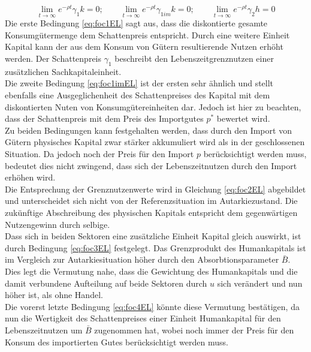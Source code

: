%
\vspace{-0.6cm}
%
\begin{equation}
	\lim_{t \to \infty}e^{-\rho t}\gamma_1k=0;\qquad \lim_{t \to \infty}e^{-\rho t}\gamma_{1im}k=0; \qquad \lim_{t \to \infty}e^{-\rho t}\gamma_2h=0
\end{equation}
%
Die erste Bedingung \eqref{eq:foc1EL} sagt aus, dass die diskontierte gesamte Konsumgütermenge dem Schattenpreis entspricht. Durch eine weitere Einheit Kapital kann der aus dem Konsum von Gütern resultierende Nutzen erhöht werden. Der Schattenpreis $\gamma_1$ beschreibt den Lebenszeitgrenznutzen einer zusätzlichen Sachkapitaleinheit.\\
%
Die zweite Bedingung \eqref{eq:foc1imEL} ist der ersten sehr ähnlich und stellt ebenfalls eine Ausgeglichenheit des Schattenpreises des Kapital mit dem diskontierten Nuten von Konsumgütereinheiten dar. Jedoch ist hier zu beachten, dass der Schattenpreis mit dem Preis des Importgutes $p^*$ bewertet wird.\\
%
Zu beiden Bedingungen kann festgehalten werden, dass durch den Import von Gütern physisches Kapital zwar stärker akkumuliert wird als in der geschlossenen Situation. Da jedoch noch der Preis für den Import $p$ berücksichtigt werden muss, bedeutet dies nicht zwingend, dass sich der Lebenszeitnutzen durch den Import erhöhen wird.\\
%
Die Entsprechung der Grenznutzenwerte wird in Gleichung \eqref{eq:foc2EL} abgebildet und unterscheidet sich nicht von der Referenzsituation im Autarkiezustand. Die zukünftige Abschreibung des physischen Kapitals entspricht dem gegenwärtigen Nutzengewinn durch selbige. \\
%
Dass sich in beiden Sektoren eine zusätzliche Einheit Kapital gleich auswirkt, ist durch Bedingung \eqref{eq:foc3EL} festgelegt. Das Grenzprodukt des Humankapitals ist im Vergleich zur Autarkiesituation höher durch den Absorbtionsparameter $\bar{B}$. Dies legt die Vermutung nahe, dass die Gewichtung des Humankapitals und die damit verbundene Aufteilung auf beide Sektoren durch $u$ sich verändert und nun höher ist, als ohne Handel.\\
%
Die vorerst letzte Bedingung \eqref{eq:foc4EL} könnte diese Vermutung bestätigen, da nun die Wertigkeit des Schattenpreises einer Einheit Humankapital für den Lebenszeitnutzen um $\bar{B}$ zugenommen hat, wobei noch immer der Preis für den Konsum des importierten Gutes berücksichtigt werden muss.
%
